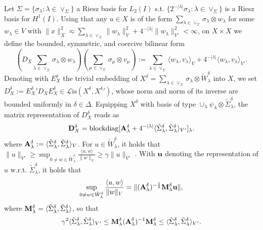 \documentclass{amsart}
\theoremstyle{definition}
\theoremstyle{remark}
\numberwithin{equation}{section}
\newcommand{\cL}{\mathcal L}
\newcommand{\Lis}{\cL\mathrm{is}}
\DeclareMathOperator{\blockdiag}{blockdiag}
\newcommand{\rem}[1]{{\color{blue}{[#1]}}}
\newcommand{\1}{\mathbb 1}
\begin{document}
Let $\Sigma=\{\sigma_\lambda \colon \lambda \in \vee_\Sigma\}$ a Riesz basis for $L_2(I)$ s.t.
$\{2^{-|\lambda|} \sigma_\lambda \colon \lambda \in \vee_\Sigma\}$ is a Riesz basis for $H^1(I)$.
Using that any $u \in X$ is of the form $\sum_{\lambda \in \vee_\Sigma} \sigma_\lambda \otimes w_\lambda$ for some $w_\lambda \in V$
with $\|x\|_X^2 \eqsim \sum_{\lambda \in \vee_\Sigma} \|w_\lambda\|_V^2+4^{-|\lambda|}\|w_\lambda\|_{V'}^2<\infty$, on $X \times X$ we define the bounded, symmetric, and coercive bilinear form
$$
(D_X \sum_{\lambda \in \vee_\Sigma} \sigma_\lambda \otimes w_\lambda)(\sum_{\mu \in \vee_\Sigma} \sigma_\mu \otimes v_\mu):=\sum_{\lambda \in \vee_\Sigma} \langle w_\lambda, v_\lambda\rangle_V+4^{-|\lambda|}\langle w_\lambda, v_\lambda\rangle_{V'}.
$$
Denoting with $E_X^\delta$ the trivial embedding of $X^\delta=\sum_{\lambda\in \vee_\Sigma} \sigma_\lambda \otimes \tilde{W}_\lambda^\delta$ into $X$, we set $D_X^\delta:={E_X^\delta}' D_X E_X^\delta\in \Lis(X^\delta,{X^\delta}')$, whose norm and norm of its inverse are bounded uniformly in $\delta \in \Delta$.
Equipping $X^\delta$ with basis of type $\cup_{\lambda} \psi_\lambda \otimes \tilde{\Sigma}_\lambda^\delta$, the matrix representation of $D_X^\delta$ reads as
$$
{\bf D}_X^\delta=\blockdiag[{\bf A}_\lambda^\delta+4^{-|\lambda|}\langle \tilde{\Sigma}_\lambda^\delta, \tilde{\Sigma}_\lambda^\delta\rangle_{V'}]_{\lambda}.
$$
where ${\bf A}_\lambda^\delta:=\langle \tilde{\Sigma}_\lambda^\delta, \tilde{\Sigma}_\lambda^\delta\rangle_V$.
For $u \in \tilde{W}_\lambda^\delta$, it holds that $\|u\|_{V'} \geq \sup_{0 \neq w \in \tilde{W}_\lambda^\delta} \frac{\langle u,w\rangle}{\|w\|_V} \geq \gamma \|u\|_{V'}$ \rem{aannemende dat $L_2$-orthogonal projector onto $\tilde{W}_\lambda^\delta$ uniform bounded is in $V$-norm, hetgeen ok als voor de collectie van paren $(W,\tilde{W}) \in {\mathcal O}$ geldt dat $\tilde{W}=W$}.
With ${\bf u}$  denoting the representation of $u$ w.r.t. $\tilde{\Sigma}_\lambda^\delta$, it holds that
$$
\sup_{0 \neq w \in \tilde{W}_\lambda^\delta} \frac{\langle u,w\rangle}{\|w\|_V}=
\|({\bf A}_\lambda^\delta)^{-\frac12} {\bf M}_\lambda^\delta {\bf u}\|,
$$
where ${\bf M}_\lambda^\delta=\langle \tilde{\Sigma}_\lambda^\delta, \tilde{\Sigma}_\lambda^\delta\rangle$, so that
$$
\gamma^2 \langle \tilde{\Sigma}_\lambda^\delta, \tilde{\Sigma}_\lambda^\delta\rangle_{V'} \leq  
{\bf M}_\lambda^\delta ({\bf A}_\lambda^\delta)^{-1} {\bf M}_\lambda^\delta
 \leq \langle \tilde{\Sigma}_\lambda^\delta, \tilde{\Sigma}_\lambda^\delta\rangle_{V'}.
$$
\end{document}
